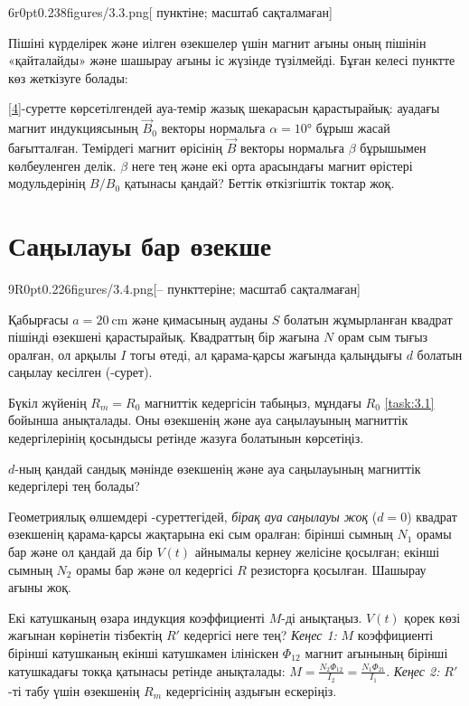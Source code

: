 \pic6r{0pt}{0.238}{figures/3.3.png}[ пунктіне; масштаб сақталмаған]

Пішіні күрделірек және иілген өзекшелер үшін магнит ағыны оның пішінін «қайталайды» және шашырау ағыны іс жүзінде түзілмейді. Бұған келесі пунктте көз жеткізуге болады:
\begin{task}
    \item \ref{4}-суретте көрсетілгендей ауа-темір жазық шекарасын қарастырайық: ауадағы магнит индукциясының $\vec B_0$ векторы нормальға $\alpha=\ang{10}$ бұрыш жасай бағытталған. Темірдегі магнит өрісінің $\vec B$ векторы нормальға $\beta$ бұрышымен көлбеуленген делік. $\beta$ неге тең және екі орта арасындағы магнит өрістері модульдерінің $B/B_0$ қатынасы қандай? Беттік өткізгіштік токтар жоқ.
\end{task}

\part{Саңылауы бар өзекше}

\pic9R{0pt}{0.226}{figures/3.4.png}[-- пункттеріне; масштаб сақталмаған]

Қабырғасы $a=\qty{20}{\cm}$ және қимасының ауданы $S$ болатын жұмырланған квадрат пішінді өзекшені қарастырайық. Квадраттың бір жағына $N$ орам сым тығыз оралған, ол арқылы $I$ тогы өтеді, ал қарама-қарсы жағында қалыңдығы $d$ болатын саңылау кесілген (-сурет).

\begin{task}
    \item Бүкіл жүйенің $R_m=R_0$ магниттік кедергісін табыңыз, мұндағы $R_0$ \eqref{task:3.1} бойынша анықталады. Оны өзекшенің және ауа саңылауының магниттік кедергілерінің қосындысы ретінде жазуға болатынын көрсетіңіз.
\end{task}

\begin{task}
    \item $d$-ның қандай сандық мәнінде өзекшенің және ауа саңылауының магниттік кедергілері тең болады?
\end{task}
\newpage

Геометриялық өлшемдері -суреттегідей, \textit{бірақ ауа саңылауы жоқ} ($d=0$) квадрат өзекшенің қарама-қарсы жақтарына екі сым оралған: бірінші сымның $N_1$ орамы бар және ол қандай да бір $V(t)$ айнымалы кернеу желісіне қосылған; екінші сымның $N_2$ орамы бар және ол кедергісі $R$ резисторға қосылған. Шашырау ағыны жоқ.
\begin{task}
    \item Екі катушканың өзара индукция коэффициенті $M$-ді анықтаңыз. $V(t)$ қорек көзі жағынан көрінетін тізбектің $R'$ кедергісі неге тең? \textit{Кеңес 1:} $M$ коэффициенті бірінші катушканың екінші катушкамен ілініскен $\Phi_{12}$ магнит ағынының бірінші катушкадағы токқа қатынасы ретінде анықталады: $M=\frac{N_2\Phi_{12}}{I_2}=\frac{N_1\Phi_{21}}{I_1}$. \textit{Кеңес 2:} $R'$-ті табу үшін өзекшенің $R_m$ кедергісінің аздығын ескеріңіз.
\end{task}

